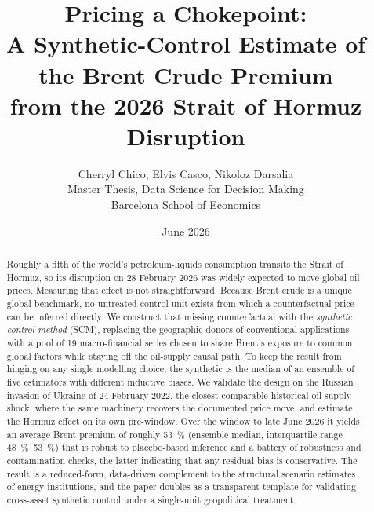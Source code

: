\documentclass[11pt,a4paper]{article}
\title{\textbf{Pricing a Chokepoint:\\ A Synthetic-Control Estimate of the Brent Crude Premium\\ from the 2026 Strait of Hormuz Disruption}}
\author{Cherryl Chico, Elvis Casco, Nikoloz Darsalia\\[0.5em]
Master Thesis, Data Science for Decision Making\\ Barcelona School of Economics}
\date{June 2026}
\begin{document}
\maketitle
\thispagestyle{empty}

\begin{abstract}
\noindent Roughly a fifth of the world's petroleum-liquids consumption transits the
Strait of Hormuz, so its disruption on 28 February 2026 was widely expected to move
global oil prices. Measuring that effect is not straightforward. Because Brent crude is a
unique global benchmark, no untreated control unit exists from which a counterfactual
price can be inferred directly. We construct that missing counterfactual with the
\emph{synthetic control method} (SCM), replacing the geographic donors of conventional
applications with a pool of 19 macro-financial series chosen to share Brent's exposure to
common global factors while staying off the oil-supply causal path. To keep the result
from hinging on any single modelling choice, the synthetic is the median of an ensemble
of five estimators with different inductive biases. We validate the design on the
Russian invasion of Ukraine of 24 February 2022, the closest comparable historical
oil-supply shock, where the same machinery recovers the documented price move, and estimate
the Hormuz effect on its own pre-window. Over the window to late June 2026 it yields an
average Brent premium of
roughly \SI{53}{\percent} (ensemble median, interquartile range \SIrange{48}{53}{\percent})
that is robust to placebo-based inference and a battery of robustness and contamination
checks, the latter indicating that any residual bias is conservative. The result is a
reduced-form, data-driven complement to the structural scenario estimates of energy
institutions, and the paper doubles as a transparent template for validating cross-asset
synthetic control under a single-unit geopolitical treatment.
\end{abstract}

\newpage
{}
\setcounter{tocdepth}{2} %
\tableofcontents
\clearpage
{}   %

\newpage

\newpage

\newpage

\newpage

\newpage

\newpage

\newpage
\clearpage
{}
{}

\end{document}

